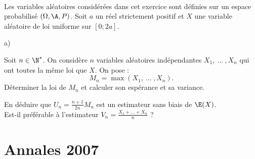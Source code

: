 \documentclass[11pt]{article}%
\begin{document}
\begin{exerciceSP}~\\
  Les variables aléatoires considérées dans cet exercice sont définies
  sur un espace probabilisé $(\Omega , \A , P)$. Soit $a$ un réel
  strictement positif et $X$ une variable aléatoire de loi uniforme
  sur $[0 ; 2a]$.
  \begin{noliste}{a)}
    \setlength{\itemsep}{2mm}
  \item Soit $n \in \N^*$. On considère $n$ variables aléatoires
    indépendantes $X_1,\ \dots\ , X_n$ qui ont toutes la même loi que
    $X$. On pose :
    \[
    M_n = \max ( X_1 ,\ \dots\ , X_n). 
    \]
    Déterminer la loi de $M_n$ et calculer son espérance et sa
    variance.
  \item En déduire que $U_n = \frac{n+1}{2n} M_n$ est un estimateur
    sans biais de $\E(X)$. \\
    Est-il préférable à l'estimateur $V_n = \frac{ X_1 + \dots + X_n
    }{n}$ ?
  \end{noliste}
\end{exerciceSP}


\newpage


\section{Annales 2007}
\end{document}
